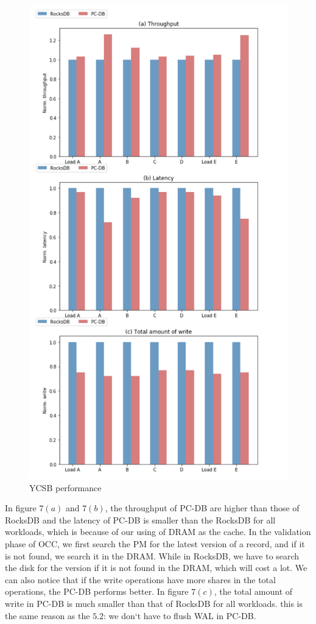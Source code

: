 \begin{figure}
    \centering
    \includegraphics[width=0.36\paperwidth]{USENIX/figure/YCSB performance.png}
    \caption{YCSB performance }
    \label{fig:YCSB}
\end{figure}
In figure $7(a)$ and $7(b)$, the throughput of PC-DB are higher than those of RocksDB and the latency of PC-DB is smaller than the RocksDB for all workloads, which is because of our using of DRAM as the cache. In the validation phase of OCC, we first search the PM for the latest version of a record, and if it is not found, we search it in the DRAM. While in RocksDB, we have to search the disk for the version if it is not found in the DRAM, which will cost a lot. We can also notice that if the write operations have more shares in the total operations, the PC-DB performs better.
In figure $7(c)$, the total amount of write in PC-DB is much smaller than that of RocksDB for all workloads. this is the same reason as the $5.2$: we don`t have to flush WAL in PC-DB.